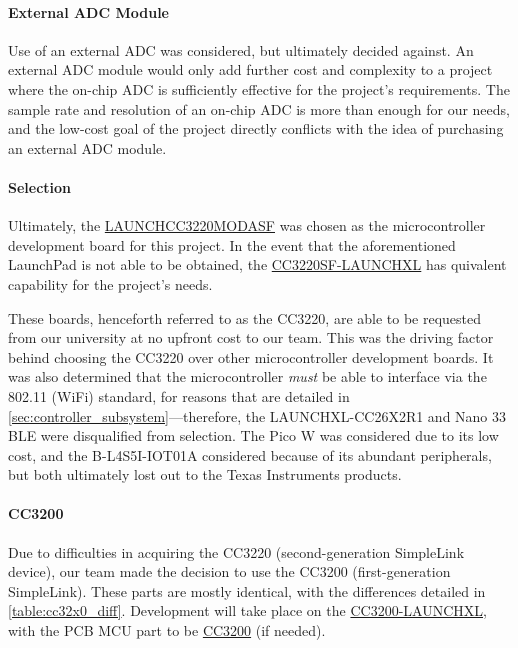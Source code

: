 \paragraph{External ADC Module} Use of an external ADC was considered, but ultimately decided against. An external ADC module would only add further cost and complexity to a project where the on-chip ADC is sufficiently effective for the project's requirements. The sample rate and resolution of an on-chip ADC is more than enough for our needs, and the low-cost goal of the project directly conflicts with the idea of purchasing an external ADC module.

\paragraph{Selection} Ultimately, the \href{https://www.ti.com/tool/LAUNCHCC3220MODASF}{LAUNCHCC3220MODASF} was chosen as the microcontroller development board for this project. In the event that the aforementioned LaunchPad is not able to be obtained, the \href{https://www.ti.com/tool/CC3220SF-LAUNCHXL}{CC3220SF-LAUNCHXL} has  quivalent capability for the project's needs.

These boards, henceforth referred to as the CC3220, are able to be requested from our university at no upfront cost to our team. This was the driving factor behind choosing the CC3220 over other microcontroller development boards. It was also determined that the microcontroller \emph{must} be able to interface via the 802.11 (WiFi) standard, for reasons that are detailed in \autoref{sec:controller_subsystem}---therefore, the LAUNCHXL-CC26X2R1 and Nano 33 BLE were disqualified from selection. The Pico W was considered due to its low cost, and the B-L4S5I-IOT01A considered because of its abundant peripherals, but both ultimately lost out to the Texas Instruments products.

\paragraph{CC3200} Due to difficulties in acquiring the CC3220 (second-generation SimpleLink device), our team made the decision to use the CC3200 (first-generation SimpleLink). These parts are mostly identical, with the differences detailed in \autoref{table:cc32x0_diff}. Development will take place on the \href{https://www.ti.com/tool/CC3200-LAUNCHXL}{CC3200-LAUNCHXL}, with the PCB MCU part to be \href{https://www.ti.com/product/CC3200}{CC3200} (if needed).

